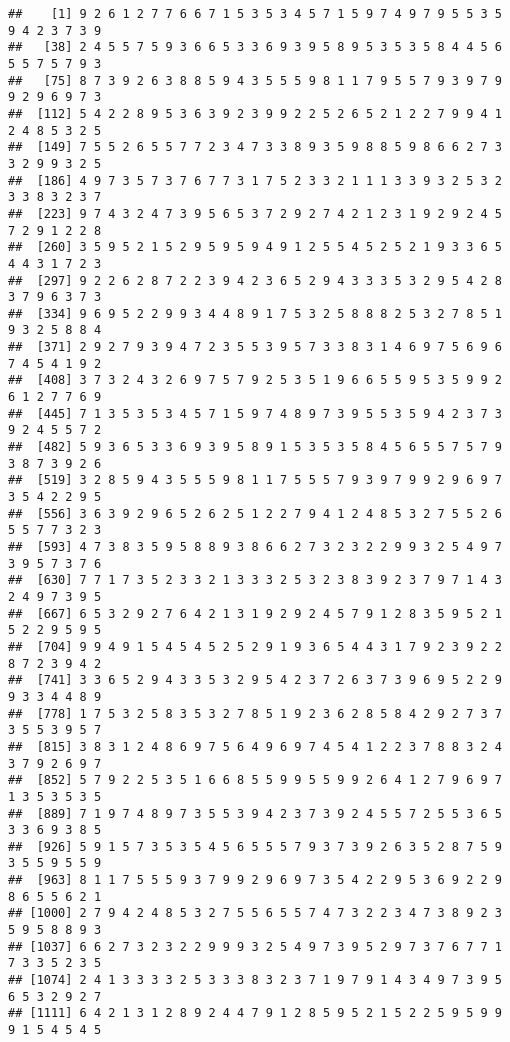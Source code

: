 \documentclass[
]{article}
\begin{document}
\begin{verbatim}
##    [1] 9 2 6 1 2 7 7 6 6 7 1 5 3 5 3 4 5 7 1 5 9 7 4 9 7 9 5 5 3 5 9 4 2 3 7 3 9
##   [38] 2 4 5 5 7 5 9 3 6 6 5 3 3 6 9 3 9 5 8 9 5 3 5 3 5 8 4 4 5 6 5 5 7 5 7 9 3
##   [75] 8 7 3 9 2 6 3 8 8 5 9 4 3 5 5 5 9 8 1 1 7 9 5 5 7 9 3 9 7 9 9 2 9 6 9 7 3
##  [112] 5 4 2 2 8 9 5 3 6 3 9 2 3 9 9 2 2 5 2 6 5 2 1 2 2 7 9 9 4 1 2 4 8 5 3 2 5
##  [149] 7 5 5 2 6 5 5 7 7 2 3 4 7 3 3 8 9 3 5 9 8 8 5 9 8 6 6 2 7 3 3 2 9 9 3 2 5
##  [186] 4 9 7 3 5 7 3 7 6 7 7 3 1 7 5 2 3 3 2 1 1 1 3 3 9 3 2 5 3 2 3 3 8 3 2 3 7
##  [223] 9 7 4 3 2 4 7 3 9 5 6 5 3 7 2 9 2 7 4 2 1 2 3 1 9 2 9 2 4 5 7 2 9 1 2 2 8
##  [260] 3 5 9 5 2 1 5 2 9 5 9 5 9 4 9 1 2 5 5 4 5 2 5 2 1 9 3 3 6 5 4 4 3 1 7 2 3
##  [297] 9 2 2 6 2 8 7 2 2 3 9 4 2 3 6 5 2 9 4 3 3 3 5 3 2 9 5 4 2 8 3 7 9 6 3 7 3
##  [334] 9 6 9 5 2 2 9 9 3 4 4 8 9 1 7 5 3 2 5 8 8 8 2 5 3 2 7 8 5 1 9 3 2 5 8 8 4
##  [371] 2 9 2 7 9 3 9 4 7 2 3 5 5 3 9 5 7 3 3 8 3 1 4 6 9 7 5 6 9 6 7 4 5 4 1 9 2
##  [408] 3 7 3 2 4 3 2 6 9 7 5 7 9 2 5 3 5 1 9 6 6 5 5 9 5 3 5 9 9 2 6 1 2 7 7 6 9
##  [445] 7 1 3 5 3 5 3 4 5 7 1 5 9 7 4 8 9 7 3 9 5 5 3 5 9 4 2 3 7 3 9 2 4 5 5 7 2
##  [482] 5 9 3 6 5 3 3 6 9 3 9 5 8 9 1 5 3 5 3 5 8 4 5 6 5 5 7 5 7 9 3 8 7 3 9 2 6
##  [519] 3 2 8 5 9 4 3 5 5 5 9 8 1 1 7 5 5 5 7 9 3 9 7 9 9 2 9 6 9 7 3 5 4 2 2 9 5
##  [556] 3 6 3 9 2 9 6 5 2 6 2 5 1 2 2 7 9 4 1 2 4 8 5 3 2 7 5 5 2 6 5 5 7 7 3 2 3
##  [593] 4 7 3 8 3 5 9 5 8 8 9 3 8 6 6 2 7 3 2 3 2 2 9 9 3 2 5 4 9 7 3 9 5 7 3 7 6
##  [630] 7 7 1 7 3 5 2 3 3 2 1 3 3 3 2 5 3 2 3 8 3 9 2 3 7 9 7 1 4 3 2 4 9 7 3 9 5
##  [667] 6 5 3 2 9 2 7 6 4 2 1 3 1 9 2 9 2 4 5 7 9 1 2 8 3 5 9 5 2 1 5 2 2 9 5 9 5
##  [704] 9 9 4 9 1 5 4 5 4 5 2 5 2 9 1 9 3 6 5 4 4 3 1 7 9 2 3 9 2 2 8 7 2 3 9 4 2
##  [741] 3 3 6 5 2 9 4 3 3 5 3 2 9 5 4 2 3 7 2 6 3 7 3 9 6 9 5 2 2 9 9 3 3 4 4 8 9
##  [778] 1 7 5 3 2 5 8 3 5 3 2 7 8 5 1 9 2 3 6 2 8 5 8 4 2 9 2 7 3 7 3 5 5 3 9 5 7
##  [815] 3 8 3 1 2 4 8 6 9 7 5 6 4 9 6 9 7 4 5 4 1 2 2 3 7 8 8 3 2 4 3 7 9 2 6 9 7
##  [852] 5 7 9 2 2 5 3 5 1 6 6 8 5 5 9 9 5 5 9 9 2 6 4 1 2 7 9 6 9 7 1 3 5 3 5 3 5
##  [889] 7 1 9 7 4 8 9 7 3 5 5 3 9 4 2 3 7 3 9 2 4 5 5 7 2 5 5 3 6 5 3 3 6 9 3 8 5
##  [926] 5 9 1 5 7 3 5 3 5 4 5 6 5 5 5 7 9 3 7 3 9 2 6 3 5 2 8 7 5 9 3 5 5 9 5 5 9
##  [963] 8 1 1 7 5 5 5 9 3 7 9 9 2 9 6 9 7 3 5 4 2 2 9 5 3 6 9 2 2 9 8 6 5 5 6 2 1
## [1000] 2 7 9 4 2 4 8 5 3 2 7 5 5 6 5 5 7 4 7 3 2 2 3 4 7 3 8 9 2 3 5 9 5 8 8 9 3
## [1037] 6 6 2 7 3 2 3 2 2 9 9 9 3 2 5 4 9 7 3 9 5 2 9 7 3 7 6 7 7 1 7 3 3 5 2 3 5
## [1074] 2 4 1 3 3 3 3 2 5 3 3 3 8 3 2 3 7 1 9 7 9 1 4 3 4 9 7 3 9 5 6 5 3 2 9 2 7
## [1111] 6 4 2 1 3 1 2 8 9 2 4 4 7 9 1 2 8 5 9 5 2 1 5 2 2 5 9 5 9 9 9 1 5 4 5 4 5

\end{verbatim}
\end{document}
